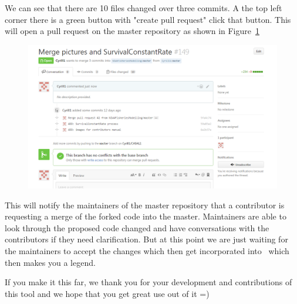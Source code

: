 We can see that there are 10 files changed over three commits. A the top left corner there is a green button with "create pull request" click that button. This will open a pull request on the master repository as shown in Figure~\ref{fig:fork_merge2}
\begin{figure}[!ht]
	\includegraphics[scale=0.6]{Figures/Pull_request1.png}
	\caption{}\label{fig:fork_merge2}
\end{figure}

This will notify the maintainers of the master repository that a contributor is requesting a merge of the forked code into the master. Maintainers are able to look through the proposed code changed and have conversations with the contributors if they need clarification. But at this point we are just waiting for the maintainers to accept the changes which then get incorporated into \CNAME\ which then makes you a legend.

If you make it this far, we thank you for your development and contributions of this tool and we hope that you get great use out of it =)


